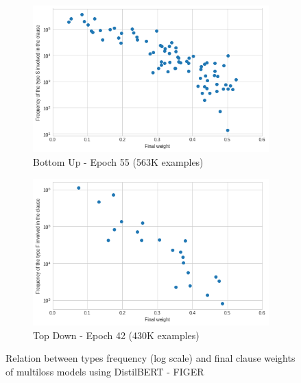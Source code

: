 \begin{figure}[bth]
     \centering
     \begin{subfigure}[b]{0.7\textwidth}
         \centering
         \includegraphics[width=\textwidth]{figures/weight_freq_distilbert_figer_bu_multiloss.png}
         \caption{Bottom Up - Epoch 55 (563K examples)}
         \label{fig:weight_freq_distilbert_figer_bu_multiloss}
         \vspace{10px}
     \end{subfigure}
     \begin{subfigure}[b]{0.7\textwidth}
         \centering
         \includegraphics[width=\textwidth]{figures/weight_freq_distilbert_figer_td_multiloss.png}
         \caption{Top Down - Epoch 42 (430K examples)}
         \label{fig:weight_freq_distilbert_figer_td_multiloss}
     \end{subfigure}
    \caption{Relation between types frequency (log scale) and final clause weights of multiloss models using DistilBERT - FIGER}
    \label{fig:weight_freq_distilbert_figer}
\end{figure}

